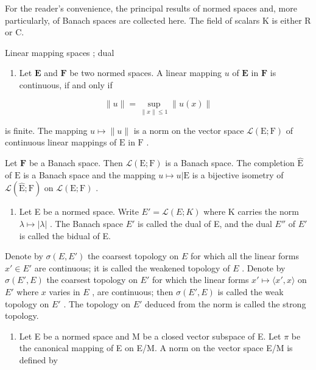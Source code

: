 
For the reader's convenience, the principal results of normed spaces and, more particularly, of Banach spaces are collected here. The field of scalars K is either R or C.

Linear mapping spaces ; dual

\begin{enumerate}
\def\labelenumi{\arabic{enumi})}
\tightlist
\item
  Let \(\mathbf{E}\) and \(\mathbf{F}\) be two normed spaces. A linear mapping \(u\) of \(\mathbf{E}\) in \(\mathbf{F}\) is continuous, if and only if
\end{enumerate}

\[
\| u \| = \sup _ {\| x \| \leqslant 1} \| u (x) \|\tag{1}
\]

is finite. The mapping \(u \mapsto \| u \|\) is a norm on the vector space \(\mathcal{L}(\mathrm{E};\mathrm{F})\) of continuous linear mappings of \(\mathrm{E}\) in \(\mathrm{F}\) .

Let \(\mathbf{F}\) be a Banach space. Then \(\mathcal{L}(\mathrm{E};\mathrm{F})\) is a Banach space. The completion \(\hat{\mathrm{E}}\) of \(\mathrm{E}\) is a Banach space and the mapping \(u\mapsto u|\mathrm{E}\) is a bijective isometry of \(\mathcal{L}(\hat{\mathrm{E}};\mathrm{F})\) on \(\mathcal{L}(\mathrm{E};\mathrm{F})\) .

\begin{enumerate}
\def\labelenumi{\arabic{enumi})}
\setcounter{enumi}{1}
\tightlist
\item
  Let E be a normed space. Write \(E' = \mathcal{L}(E; K)\) where K carries the norm \(\lambda \mapsto |\lambda|\) . The Banach space \(E'\) is called the dual of E, and the dual \(E''\) of \(E'\) is called the bidual of E.
\end{enumerate}

Denote by \(\sigma(E, E')\) the coarsest topology on \(E\) for which all the linear forms \(x' \in E'\) are continuous; it is called the weakened topology of \(E\) . Denote by \(\sigma(E', E)\) the coarsest topology on \(E'\) for which the linear forms \(x' \mapsto \langle x', x \rangle\) on \(E'\) where \(x\) varies in \(E\) , are continuous; then \(\sigma(E', E)\) is called the weak topology on \(E'\) . The topology on \(E'\) deduced from the norm is called the strong topology.

\begin{enumerate}
\def\labelenumi{\arabic{enumi})}
\setcounter{enumi}{2}
\tightlist
\item
  Let E be a normed space and M be a closed vector subspace of E. Let \(\pi\) be the canonical mapping of E on E/M. A norm on the vector space E/M is defined by
\end{enumerate}

